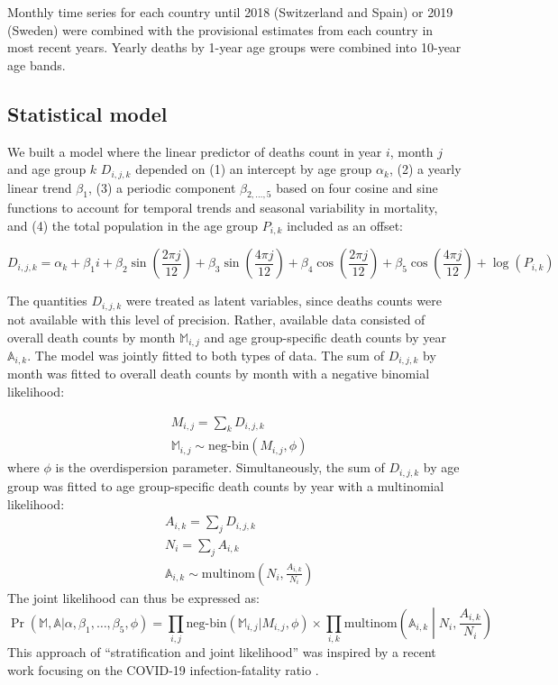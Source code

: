 \documentclass{article}
\begin{document}
	Monthly time series for each country until 2018 (Switzerland and Spain) or 2019 (Sweden) were combined with the provisional estimates from each country in most recent years. Yearly deaths by 1-year age groups were combined into 10-year age bands. 
	
	\subsection{Statistical model}
	
	We built a model where the linear predictor of deaths count in year $i$, month $j$ and age group $k$ $D_{i,j,k}$ depended on (1) an intercept by age group $\alpha_k$, (2) a yearly linear trend $\beta_1$, (3) a periodic component $\beta_{2,\ldots,5}$ based on four cosine and sine functions to account for temporal trends and seasonal variability in mortality, and (4) the total population in the age group $P_{i,k}$ included as an offset: 
	
	\begin{equation}
		D_{i,j,k} = \alpha_k + 
		\beta_1 i + 
		\beta_2 \sin\left(\frac{2\pi j}{12}\right) + 
		\beta_3 \sin\left(\frac{4\pi j}{12}\right) + 
		\beta_4 \cos\left(\frac{2\pi j}{12}\right) + 
		\beta_5 \cos\left(\frac{4\pi j}{12}\right) + 
		\log(P_{i,k})
	\end{equation}
	
	
	The quantities $D_{i,j,k}$ were treated as latent variables, since deaths counts were not available with this level of precision. Rather, available data consisted of overall death counts by month $\mathds{M}_{i,j}$ and age group-specific death counts by year $\mathds{A}_{i,k}$. The model was jointly fitted to both types of data.  The sum of $D_{i,j,k}$ by month was fitted to overall death counts by month with a negative binomial likelihood:
	
	\begin{align}
		&M_{i,j} = \sum_k D_{i,j,k} \\
		&\mathds{M}_{i,j} \sim \text{neg-bin}\left(M_{i,j},\phi\right)
	\end{align}
	where $\phi$ is the overdispersion parameter.
	Simultaneously, the sum of $D_{i,j,k}$ by age group was fitted to age group-specific death counts by year with a multinomial likelihood:
	\begin{align}
		&A_{i,k} = \sum_j D_{i,j,k} \\
		&N_i = \sum_j A_{i,k} \\
		&\mathds{A}_{i,k} \sim \text{multinom}\left(N_i, \frac{A_{i,k}}{N_i}\right)
	\end{align}
	The joint likelihood can thus be expressed as:
	\begin{equation}
		\Pr(\mathds{M},\mathds{A} | \alpha, \beta_1, \ldots, \beta_5,\phi) = \prod_{i,j} \text{neg-bin}\left(\mathds{M}_{i,j} | M_{i,j},\phi\right) \times \prod_{i,k} \text{multinom}\left(\mathds{A}_{i,k} \middle| N_i, \frac{A_{i,k}}{N_i}\right)
	\end{equation}
	This approach of ``stratification and joint likelihood'' was inspired by a recent work focusing on the COVID-19 infection-fatality ratio \cite{hauser2020estimation}.
	
\end{document}
